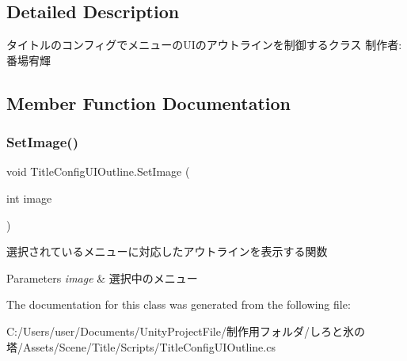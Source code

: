 \subsection{Detailed Description}
タイトルのコンフィグでメニューの\+U\+Iのアウトラインを制御するクラス 制作者\+:番場宥輝 



\subsection{Member Function Documentation}
\mbox{\label{class_title_config_u_i_outline_a9cc515749de04dacb3b5d287108dab5a}} 
\subsubsection{\texorpdfstring{Set\+Image()}{SetImage()}}
{\footnotesize\ttfamily void Title\+Config\+U\+I\+Outline.\+Set\+Image (\begin{DoxyParamCaption}\item[{int}]{image }\end{DoxyParamCaption})\hspace{0.3cm}{\ttfamily [inline]}}



選択されているメニューに対応したアウトラインを表示する関数 


\begin{DoxyParams}{Parameters}
{\em image} & 選択中のメニュー\\
\hline
\end{DoxyParams}


The documentation for this class was generated from the following file\+:\begin{DoxyCompactItemize}
\item 
C\+:/\+Users/user/\+Documents/\+Unity\+Project\+File/制作用フォルダ/しろと氷の塔/\+Assets/\+Scene/\+Title/\+Scripts/Title\+Config\+U\+I\+Outline.\+cs\end{DoxyCompactItemize}
